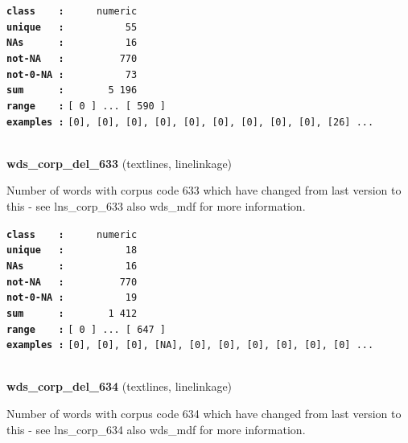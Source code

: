 \documentclass[]{article}
\begin{document}
\textbf{\texttt{class\ \ \ \ :}} \texttt{~~~~~numeric}\\
\textbf{\texttt{unique\ \ \ :}} \texttt{~~~~~~~~~~55}\\
\textbf{\texttt{NAs\ \ \ \ \ \ :}} \texttt{~~~~~~~~~~16}\\
\textbf{\texttt{not-NA\ \ \ :}} \texttt{~~~~~~~~~770}\\
\textbf{\texttt{not-0-NA\ :}} \texttt{~~~~~~~~~~73}\\
\textbf{\texttt{sum\ \ \ \ \ \ :}} \texttt{~~~~~~~5~196}\\
\textbf{\texttt{range\ \ \ \ :}}
\texttt{{[}\ 0\ {]}\ ...\ {[}\ 590\ {]}}\\
\textbf{\texttt{examples\ :}}
\texttt{{[}0{]},\ {[}0{]},\ {[}0{]},\ {[}0{]},\ {[}0{]},\ {[}0{]},\ {[}0{]},\ {[}0{]},\ {[}0{]},\ {[}26{]}\ ...}\\

~

\textbf{wds\_corp\_del\_633} (textlines, linelinkage)

Number of words with corpus code 633 which have changed from last
version to this - see lns\_corp\_633 also wds\_mdf for more information.

\textbf{\texttt{class\ \ \ \ :}} \texttt{~~~~~numeric}\\
\textbf{\texttt{unique\ \ \ :}} \texttt{~~~~~~~~~~18}\\
\textbf{\texttt{NAs\ \ \ \ \ \ :}} \texttt{~~~~~~~~~~16}\\
\textbf{\texttt{not-NA\ \ \ :}} \texttt{~~~~~~~~~770}\\
\textbf{\texttt{not-0-NA\ :}} \texttt{~~~~~~~~~~19}\\
\textbf{\texttt{sum\ \ \ \ \ \ :}} \texttt{~~~~~~~1~412}\\
\textbf{\texttt{range\ \ \ \ :}}
\texttt{{[}\ 0\ {]}\ ...\ {[}\ 647\ {]}}\\
\textbf{\texttt{examples\ :}}
\texttt{{[}0{]},\ {[}0{]},\ {[}0{]},\ {[}NA{]},\ {[}0{]},\ {[}0{]},\ {[}0{]},\ {[}0{]},\ {[}0{]},\ {[}0{]}\ ...}\\

~

\textbf{wds\_corp\_del\_634} (textlines, linelinkage)

Number of words with corpus code 634 which have changed from last
version to this - see lns\_corp\_634 also wds\_mdf for more information.
\end{document}
